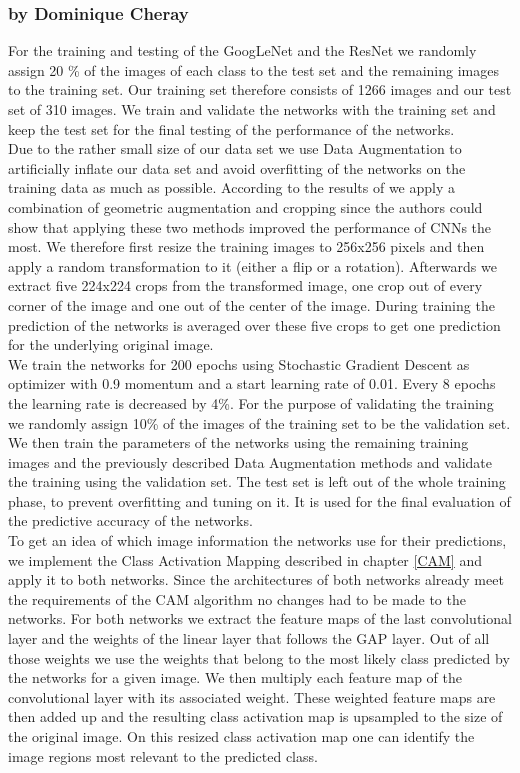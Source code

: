 \documentclass[11pt]{report}
\begin{document}
\subsubsection{by Dominique Cheray}
For the training and testing of the GoogLeNet and the ResNet we randomly
assign 20 \% of the images of each class to the test set and the remaining
images to the training set. Our training set therefore consists of 1266 images
and our test set of 310 images. We train and validate the networks with the
training set and keep the test set for the final testing of the performance
of the networks. \\
Due to the rather small size of our data set we use Data Augmentation to
artificially inflate our data set and avoid overfitting of the networks on the
training data as much as possible. According to the results of \cite{taylor2017improving} we apply
a combination of geometric augmentation and cropping since the authors could
show that applying these two methods improved the performance of CNNs
the most. We therefore first resize the training images to 256x256 pixels and
then apply a random transformation to it (either a flip or a rotation).
Afterwards we extract five 224x224 crops from the transformed image, one crop
out of every corner of the image and one out of the center of the image. During
training the prediction of the networks is averaged over these five crops
to get one prediction for the underlying original image. \\
We train the networks for 200 epochs using Stochastic Gradient Descent as
optimizer with 0.9 momentum and a start learning rate of 0.01. Every 8 epochs
the learning rate is decreased by 4\%. For the purpose of validating the
training we randomly assign 10\% of the images of the training set to be the validation
set. We then train the parameters of the networks using the remaining training
images and the previously described Data Augmentation methods and validate the
training using the validation set. The test set is left out of the whole
training phase, to prevent overfitting and tuning on it. It is used for the
final evaluation of the predictive accuracy of the networks. \\
To get an idea of which image information the networks use for their
predictions, we implement the Class Activation Mapping described in chapter
\ref{CAM} and apply it to both networks. Since the architectures of both
networks already 
meet the requirements of the CAM algorithm no changes had to be made to the
networks. For both networks we extract the feature maps of the last
convolutional layer and the weights of the linear layer that follows the GAP
layer. Out of all those weights we use the weights that belong to the most
likely class predicted by the networks for a given image. We then multiply each
feature map of the convolutional layer with its associated weight. These
weighted feature maps are then added up and the resulting class activation map
is upsampled to the size of the original image. On this resized class activation
map one can identify the image regions most relevant to the predicted class.  
\end{document}
